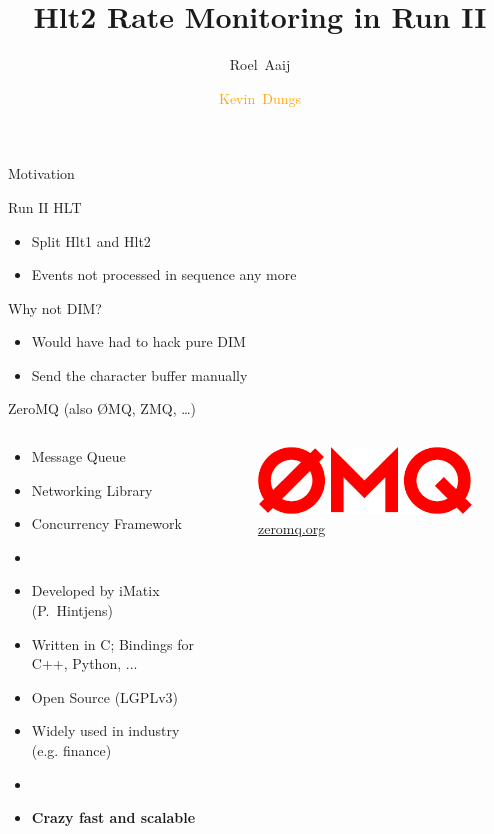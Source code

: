 \documentclass[aspectratio=1610,compress,titleprogressbar]{beamer}
\title{Hlt2 Rate Monitoring in Run II}
\author[K.~Dungs]{Roel~Aaij\inst{1} \and \textcolor{orange}{Kevin~Dungs\inst{2}}}
\institute{\inst{1} CERN \and \inst{2} TU Dortmund}
\begin{document}
\maketitle

\begin{frame}{Motivation}
  \begin{block}{Run II HLT}
    \begin{itemize}
      \item Split Hlt1 and Hlt2
      \item Events not processed in sequence any more
    \end{itemize}
  \end{block}
  \begin{block}{Why not DIM?}
    \begin{itemize}
      \item Would have had to hack pure DIM
      \item Send the character buffer manually
    \end{itemize}
  \end{block}
\end{frame}

\begin{frame}{ZeroMQ (also ØMQ, ZMQ, \dots)} 
  \begin{columns}
    \begin{column}{.6\textwidth}
      \begin{itemize}
        \item Message Queue
        \item Networking Library
        \item Concurrency Framework
        \item [] {}
        \item Developed by iMatix (P.~Hintjens)
        \item Written in C; Bindings for C++, Python, ...
        \item Open Source (LGPLv3)
        \item Widely used in industry (e.g. finance)
        \item [] {}
        \item \textbf{Crazy fast and scalable}
      \end{itemize}
    \end{column}
    \begin{column}{.4\textwidth}
      \begin{figure}
        \centering
        \includegraphics[width=.8\textwidth]{graphics/zmq.png}
        \caption{\href{http://zeromq.org}{zeromq.org}}
      \end{figure}
    \end{column}
  \end{columns}
\end{frame}
\end{document}
